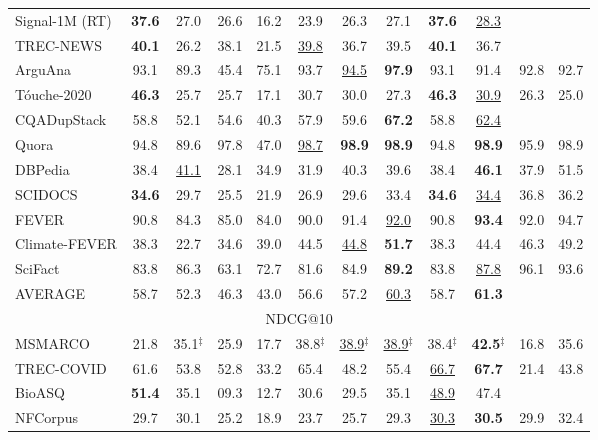 \begin{table}[t!]
{\begin{tabular}{@{}l  c  c  c c c c c  c c  c c@{}}
   Signal-1M (RT)& \textbf{37.6} & 27.0 & 26.6 & 16.2 & 23.9 & 26.3 & 27.1 & \textbf{37.6} & \underline{28.3} \\
   TREC-NEWS     & \textbf{40.1} & 26.2 & 38.1 & 21.5 & \underline{39.8} & 36.7 & 39.5 & \textbf{40.1} & 36.7 \\
   ArguAna       & 93.1 & 89.3 & 45.4 & 75.1 & 93.7 & \underline{94.5} & \textbf{97.9} & 93.1 & 91.4 & 92.8 & 92.7 \\
   T\'ouche-2020 & \textbf{46.3} & 25.7 & 25.7 & 17.1 & 30.7 & 30.0 & 27.3 & \textbf{46.3} & \underline{30.9} & 26.3 & 25.0 \\
   CQADupStack   & 58.8 & 52.1 & 54.6 & 40.3 & 57.9 & 59.6 & \textbf{67.2} & 58.8 & \underline{62.4} \\
   Quora         & 94.8 & 89.6 & 97.8 & 47.0 & \underline{98.7} & \textbf{98.9} & \textbf{98.9} & 94.8 & \textbf{98.9} & 95.9 & {98.9} \\
   DBPedia       & 38.4 & \underline{41.1} & 28.1 & 34.9 & 31.9 & 40.3 & 39.6 & 38.4 & \textbf{46.1} & 37.9 & {51.5} \\
   SCIDOCS       & \textbf{34.6} & 29.7 & 25.5 & 21.9 & 26.9 & 29.6 & 33.4 & \textbf{34.6} & \underline{34.4} & {36.8} & {36.2}\\
   FEVER         & 90.8 & 84.3 & 85.0 & 84.0 & 90.0 & 91.4 & \underline{92.0} & 90.8 & \textbf{93.4} & 92.0 & {94.7} \\
   Climate-FEVER & 38.3 & 22.7 & 34.6 & 39.0 & 44.5 & \underline{44.8} & \textbf{51.7} & 38.3 & 44.4 & 46.3 & 49.2 \\
   SciFact       & 83.8 & 86.3 & 63.1 & 72.7 & 81.6 & 84.9 & \textbf{89.2} & 83.8 & \underline{87.8} & {96.1} & {93.6} \\
   \midrule
   AVERAGE       & 58.7 & 52.3 & 46.3  & 43.0 & 56.6 & 57.2 & \underline{60.3} & 58.7 & \textbf{61.3} \\
   \midrule
   \multicolumn{12}{c}{NDCG@10}\\
   \midrule
   MSMARCO & 21.8 & 35.1$^\ddagger$ & 25.9 & 17.7 & 38.8$^\ddagger$ & \underline{38.9}$^\ddagger$ & \underline{38.9}$^\ddagger$ & 38.4$^\ddagger$ & \textbf{42.5}$^\ddagger$ & 16.8 & 35.6\\
   TREC-COVID    & 61.6 & 53.8 & 52.8 & 33.2 & 65.4 & 48.2 & 55.4 & \underline{66.7} & \textbf{67.7} & 21.4 & 43.8 \\
   BioASQ        & \textbf{51.4} & 35.1 & 09.3 & 12.7 & 30.6 & 29.5 & 35.1 & \underline{48.9} & 47.4 \\
   NFCorpus      & 29.7 & 30.1 & 25.2 & 18.9 & 23.7 & 25.7 & 29.3 & \underline{30.3} & \textbf{30.5} &  29.9 & \colorbox{blue!30}{32.4}\\

\end{tabular}}
\end{table}
